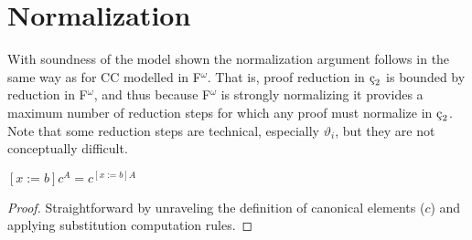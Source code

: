 \section{Normalization}

With soundness of the model shown the normalization argument follows in the same way as for CC modelled in F$^\omega$.
That is, proof reduction in $\ced$ is bounded by reduction in F$^\omega$, and thus because F$^\omega$ is strongly normalizing it provides a maximum number of reduction steps for which any proof must normalize in $\ced$.
Note that some reduction steps are technical, especially $\vartheta_i$, but they are not conceptually difficult.

\begin{lemma}
    \label{lem:3:canonical_subst}
    $[x := b]c^A = c^{[x := b]A}$
\end{lemma}
\begin{proof}
    Straightforward by unraveling the definition of canonical elements ($c$) and applying substitution computation rules.
\end{proof}

